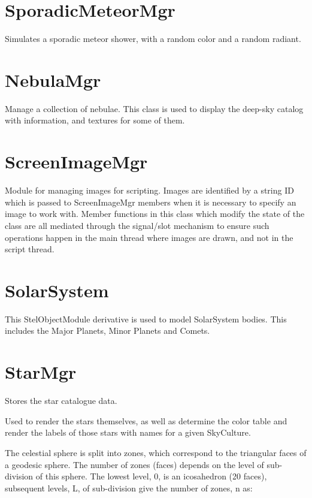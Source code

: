 \section{SporadicMeteorMgr}
\label{sec:ScriptingAPI:SporadicMeteorMgr}
Simulates a sporadic meteor shower, with a random color and a random radiant.

\section{NebulaMgr}
\label{sec:ScriptingAPI:NebulaMgr}
Manage a collection of nebulae. This class is used to display the deep-sky catalog with information, and textures for some of them.

\section{ScreenImageMgr}
\label{sec:ScriptingAPI:ScreenImageMgr}
Module for managing images for scripting. Images are identified by a string ID which is passed to ScreenImageMgr members when it is necessary to specify an image to work with. Member functions in this class which modify the state of the class are all mediated through the signal/slot mechanism to ensure such operations happen in the main thread where images are drawn, and not in the script thread.

\section{SolarSystem}
\label{sec:ScriptingAPI:SolarSystem}
This StelObjectModule derivative is used to model SolarSystem bodies. This includes the Major Planets, Minor Planets and Comets.

\section{StarMgr}
\label{sec:ScriptingAPI:StarMgr}

Stores the star catalogue data.

Used to render the stars themselves, as well as determine the color table and render the labels of those stars with names for a given SkyCulture.

The celestial sphere is split into zones, which correspond to the triangular faces of a geodesic sphere. The number of zones (faces) depends on the level of sub-division of this sphere. The lowest level, 0, is an icosahedron (20 faces), subsequent levels, L, of sub-division give the number of zones, n as:

